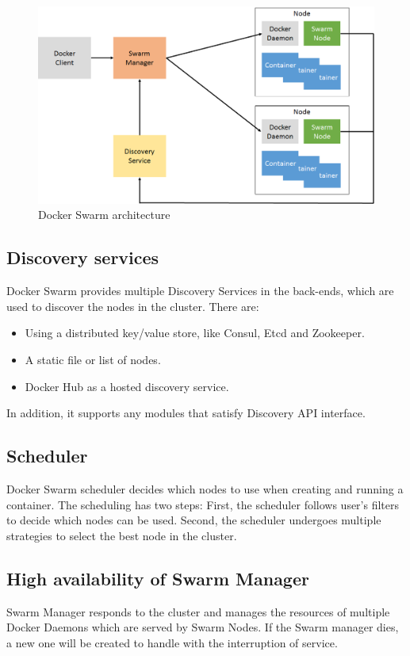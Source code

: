 \begin{figure}[h]
\begin{center}
\includegraphics[width=15cm]{figure/swarm_docker.png}
\end{center}
\caption{Docker Swarm architecture}
\end{figure}

\subsection{Discovery services}
Docker Swarm provides multiple Discovery Services in the back-ends, which are used to discover the nodes in the cluster. There are:
\begin{itemize}
    \item Using a distributed key/value store, like Consul, Etcd and Zookeeper.
    \item A static file or list of nodes.
    \item Docker Hub as a hosted discovery service.
\end{itemize}
In addition, it supports any modules that satisfy Discovery API interface.

\subsection{Scheduler}
Docker Swarm scheduler decides which nodes to use when creating and running a container. The scheduling has two steps:
First, the scheduler follows user's filters to decide which nodes can be used.
Second, the scheduler undergoes multiple strategies to select the best node in the cluster.

\subsection{High availability of Swarm Manager}
Swarm Manager responds to the cluster and manages the resources of multiple Docker Daemons which are served by Swarm Nodes. If the Swarm manager dies, a new one will be created to handle with the interruption of service.

